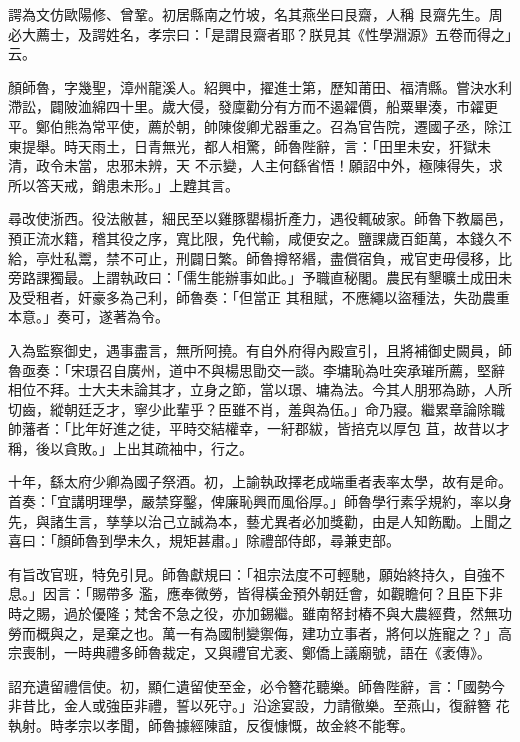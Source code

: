 \begin{pinyinscope}
 諤為文仿歐陽修、曾鞏。初居縣南之竹坡，名其燕坐曰艮齋，人稱
 艮齋先生。周必大薦士，及諤姓名，孝宗曰：「是謂艮齋者耶？朕見其《性學淵源》五卷而得之」云。



 顏師魯，字幾聖，漳州龍溪人。紹興中，擢進士第，歷知莆田、福清縣。嘗決水利滯訟，闢陂洫綿四十里。歲大侵，發廩勸分有方而不遏糴價，船粟畢湊，市糴更平。鄭伯熊為常平使，薦於朝，帥陳俊卿尤器重之。召為官告院，遷國子丞，除江東提舉。時天雨土，日青無光，都人相驚，師魯陛辭，言：「田里未安，犴獄未清，政令未當，忠邪未辨，天
 不示變，人主何繇省悟！願詔中外，極陳得失，求所以答天戒，銷患未形。」上韙其言。



 尋改使浙西。役法敝甚，細民至以雞豚罌榻折產力，遇役輒破家。師魯下教屬邑，預正流水籍，稽其役之序，寬比限，免代輸，咸便安之。鹽課歲百鉅萬，本錢久不給，亭灶私鬻，禁不可止，刑闢日繁。師魯撙帑緡，盡償宿負，戒官吏毋侵移，比旁路課獨最。上謂執政曰：「儒生能辦事如此。」予職直秘閣。農民有墾曠土成田未及受租者，奸豪多為己利，師魯奏：「但當正
 其租賦，不應繩以盜種法，失劭農重本意。」奏可，遂著為令。



 入為監察御史，遇事盡言，無所阿撓。有自外府得內殿宣引，且將補御史闕員，師魯亟奏：「宋璟召自廣州，道中不與楊思勖交一談。李墉恥為吐突承璀所薦，堅辭相位不拜。士大夫未論其才，立身之節，當以璟、墉為法。今其人朋邪為跡，人所切齒，縱朝廷乏才，寧少此輩乎？臣雖不肖，羞與為伍。」命乃寢。繼累章論除職帥藩者：「比年好進之徒，平時交結權幸，一紆郡紱，皆掊克以厚包
 苴，故昔以才稱，後以貪敗。」上出其疏袖中，行之。



 十年，繇太府少卿為國子祭酒。初，上諭執政擇老成端重者表率太學，故有是命。首奏：「宜講明理學，嚴禁穿鑿，俾廉恥興而風俗厚。」師魯學行素孚規約，率以身先，與諸生言，孳孳以治己立誠為本，藝尤異者必加獎勸，由是人知飭勵。上聞之喜曰：「顏師魯到學未久，規矩甚肅。」除禮部侍郎，尋兼吏部。



 有旨改官班，特免引見。師魯獻規曰：「祖宗法度不可輕馳，願始終持久，自強不息。」因言：「賜帶多
 濫，應奉微勞，皆得橫金預外朝廷會，如觀瞻何？且臣下非時之賜，過於優隆；梵舍不急之役，亦加錫繼。雖南帑封樁不與大農經費，然無功勞而概與之，是棄之也。萬一有為國制變禦侮，建功立事者，將何以旌寵之？」高宗喪制，一時典禮多師魯裁定，又與禮官尤袤、鄭僑上議廟號，語在《袤傳》。



 詔充遺留禮信使。初，顯仁遺留使至金，必令簪花聽樂。師魯陛辭，言：「國勢今非昔比，金人或強臣非禮，誓以死守。」沿途宴設，力請徹樂。至燕山，復辭簪
 花執射。時孝宗以孝聞，師魯據經陳誼，反復慷慨，故金終不能奪。




\end{pinyinscope}
